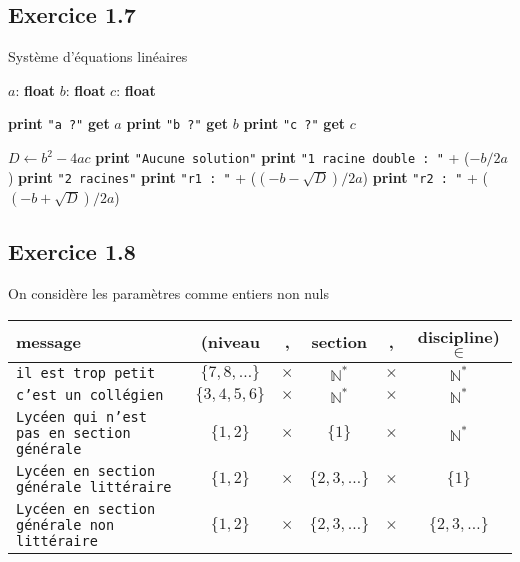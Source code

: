\documentclass[a4paper,10pt]{report}
\newcommand\Printtt[1]{\State \textbf{print }\texttt{"#1"}}
\newcommand\Get{\State \textbf{get }}
\begin{document}
\subsection*{Exercice 1.7}
\begin{algorithm}
	\caption{Système d'équations linéaires}
	\begin{algorithmic}
		\Vars
		\State $a$: \textbf{float}
		\State $b$: \textbf{float}
		\State $c$: \textbf{float}
		\EndVars
		
		\Statex
		\Begin
			\Printtt{a ?}
			\Get $a$
			\Printtt{b ?}
			\Get $b$
			\Printtt{c ?}
			\Get $c$
			
			\Statex
			\State $D \leftarrow b^2 - 4ac$ 
				\Printtt{Aucune solution}
				\Printtt{1 racine double : } + ($-b/2a$)
			\Else
				\Printtt{2 racines}
				\Printtt{r1 : } + ($(-b-\sqrt{D})/2a$)
				\Printtt{r2 : } + ($(-b+\sqrt{D})/2a$)
			\EndIf
		\End
	\end{algorithmic}
\end{algorithm}
	
\subsection*{Exercice 1.8}

On considère les paramètres comme entiers non nuls

\begin{tabular}{|l|c c c c c|}
	\hline
	message                                           & (niveau           & ,        &  section         & ,        & discipline)  $\in$\\
	\hline
	\texttt{il est trop petit}                        & $\{7,8,\ldots\}$ & $\times$ & $\mathbb{N}^*$   & $\times$ & $\mathbb{N}^*$ \\
	\hline
	\texttt{c'est un collégien}                       & $\{3, 4, 5, 6\}$ & $\times$ & $\mathbb{N}^*$   & $\times$ & $\mathbb{N}^*$ \\
	\hline
	\texttt{Lycéen qui n'est pas en section générale} & $\{1, 2\}$       & $\times$ & $\{1\}$          & $\times$ & $\mathbb{N}^*$\\
	\hline
	\texttt{Lycéen en section générale littéraire}    & $\{1, 2\}$       & $\times$ & $\{2,3,\ldots\}$ & $\times$ &  $\{1\}$\\
	\hline
	\texttt{Lycéen en section générale non littéraire}& $\{1, 2\}$       & $\times$ & $\{2,3,\ldots\}$ & $\times$ &  $\{2,3,\ldots\}$\\
	\hline
\end{tabular}
	
\end{document}
